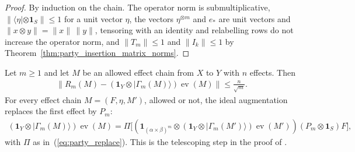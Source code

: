 \begin{proof}\leanok
    By induction on the chain. The operator norm is submultiplicative,
    $\lVert\langle\eta|\otimes\mathbf 1_S\rVert\le1$ for a unit vector
    $\eta$, the vectors $\eta^{\otimes m}$ and $e_*$ are unit vectors and
    $\lVert x\otimes y\rVert=\lVert x\rVert\,\lVert y\rVert$, tensoring with
    an identity and relabelling rows do not increase the operator norm, and
    $\lVert T_m\rVert\le1$ and $\lVert I_k\rVert\le1$ by
    Theorem~\ref{thm:party_insertion_matrix_norms}.
\end{proof}

\begin{theorem}
    \label{thm:party_effect_chain_replace}
    \leanok
    Let $m\ge1$ and let $M$ be an allowed effect chain from $X$ to $Y$ with
    $n$ effects. Then
    \begin{align}
        \bigl\lVert R_m(M)-(\mathbf 1_Y\otimes|\Gamma_m(M)\rangle)
        \operatorname{ev}(M)\bigr\rVert\le\frac n{\sqrt m}.
        \label{eq:party_chain_error}
    \end{align}
    For every effect chain $M=(F,\eta,M')$, allowed or not, the ideal
    augmentation replaces the first effect by $P_m$:
    \begin{align}
        (\mathbf 1_Y\otimes|\Gamma_m(M)\rangle)\operatorname{ev}(M)
        =\Pi\bigl[(\mathbf 1_{(\alpha\times\beta)^m}\otimes
                (\mathbf 1_Y\otimes|\Gamma_m(M')\rangle)\operatorname{ev}(M'))
                (P_m\otimes\mathbf 1_S)F\bigr],
        \label{eq:party_chain_ideal}
    \end{align}
    with $\Pi$ as in~(\ref{eq:party_replace}). This is the telescoping step
    in the proof of \cite[Lemma~5.1]{OpenAI2026PolynomialPEPS}.
\end{theorem}

